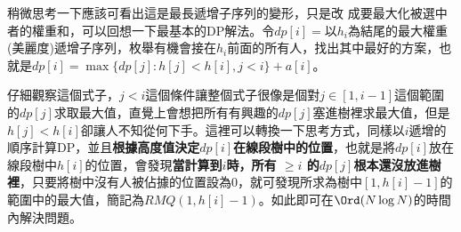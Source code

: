 稍微思考一下應該可看出這是最長遞增子序列的變形，只是改
成要最大化被選中者的權重和，可以回想一下最基本的DP解法。令$dp[i] = $以$h_i$為結尾的最大權重(美麗度)遞增子序列，枚舉有機會接在$h_i$前面的所有人，找出其中最好的方案，也就是$dp[i] = \max\{dp[j] : h[j] < h[i], j < i\} + a[i]$。

仔細觀察這個式子，$j < i$這個條件讓整個式子很像是個對$j \in [1, i - 1]$這個範圍的$dp[j]$求取最大值，直覺上會想把所有有興趣的$dp[j]$塞進樹裡求最大值，但是$h[j] < h[i]$卻讓人不知從何下手。這裡可以轉換一下思考方式，同樣以$i$遞增的順序計算DP，並且\textbf{根據高度值決定$dp[i]$在線段樹中的位置}，也就是將$dp[i]$放在線段樹中$h[i]$的位置，會發現\textbf{當計算到$i$時，所有 $\geq i$ 的$dp[j]$根本還沒放進樹裡}，只要將樹中沒有人被佔據的位置設為$0$，就可發現所求為樹中$[1, h[i] - 1]$的範圍中的最大值，簡記為$RMQ(1, h[i] - 1)$。如此即可在$\Ord (N\log N)$的時間內解決問題。

